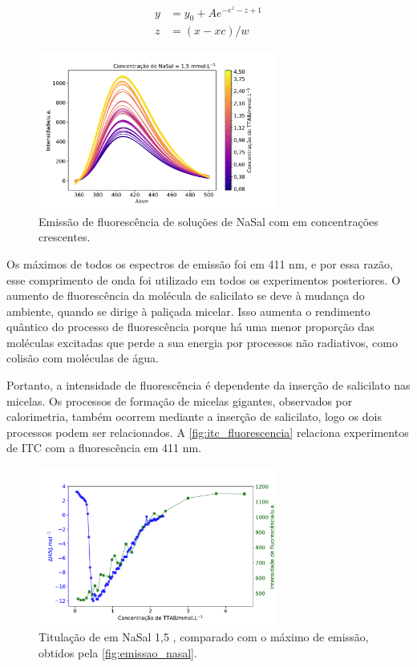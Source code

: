 	\begin{subequations}
		\begin{align}
		y &= y_0 + A e^{-e^{z} - z + 1} \\
		z &= \left( x - xc \right)/w 
		\end{align}
		\label{eqn:ajuste_extremo}
	\end{subequations}
	
	\begin{figure}[h]
		\centering
		\includegraphics[width=0.7\textwidth]{imagens/fluor/emissao_nasal}
		\caption{Emissão de fluorescência de soluções de NaSal com \TTAB{} em concentrações crescentes.}
		\label{fig:emissao_nasal}
	\end{figure}
	
	Os máximos de todos os espectros de emissão foi em 411 nm, e por essa razão, esse comprimento de onda foi utilizado em todos os experimentos posteriores. O aumento de fluorescência da molécula de salicilato se deve à mudança do ambiente, quando se dirige à paliçada micelar. Isso aumenta o rendimento quântico do processo de fluorescência porque há uma menor proporção das moléculas excitadas que perde a sua energia por processos não radiativos, como colisão com moléculas de água.
	
	Portanto, a intensidade de fluorescência é dependente da inserção de salicilato nas micelas. Os processos de formação de micelas gigantes, observados por calorimetria, também ocorrem mediante a inserção de salicilato, logo os dois processos podem ser relacionados. A \autoref{fig:itc_fluorescencia} relaciona experimentos de ITC com a fluorescência em 411 nm.
	
	\begin{figure}[h]
		\centering
		\includegraphics[width=0.7\textwidth]{imagens/fluor/itc_fluorescencia}
		\caption{Titulação de  \mM{} em NaSal 1,5 \mM, comparado com o máximo de emissão, obtidos pela \autoref{fig:emissao_nasal}.}
		\label{fig:itc_fluorescencia}
	\end{figure}
	
